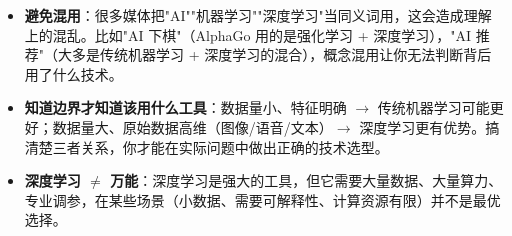 \documentclass[a4paper,11pt]{ctexart}
\begin{document}
\begin{beginnerbox}
    \begin{itemize}
        \item \textbf{避免混用}：很多媒体把"AI""机器学习""深度学习"当同义词用，这会造成理解上的混乱。比如"AI 下棋"（AlphaGo 用的是强化学习 + 深度学习），"AI 推荐"（大多是传统机器学习 + 深度学习的混合），概念混用让你无法判断背后用了什么技术。
        \item \textbf{知道边界才知道该用什么工具}：数据量小、特征明确 $\to$ 传统机器学习可能更好；数据量大、原始数据高维（图像/语音/文本）$\to$ 深度学习更有优势。搞清楚三者关系，你才能在实际问题中做出正确的技术选型。
        \item \textbf{深度学习 $\neq$ 万能}：深度学习是强大的工具，但它需要大量数据、大量算力、专业调参，在某些场景（小数据、需要可解释性、计算资源有限）并不是最优选择。
    \end{itemize}
\end{beginnerbox}
\end{document}
